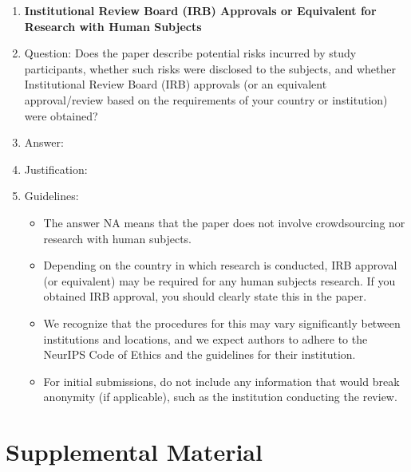 \documentclass{article} %
\newcounter{ct}
\theoremstyle{definition}
\theoremstyle{remark}
\begin{document}
\begin{enumerate}
\item {\bf Institutional Review Board (IRB) Approvals or Equivalent for Research with Human Subjects}
    \item[] Question: Does the paper describe potential risks incurred by study participants, whether such risks were disclosed to the subjects, and whether Institutional Review Board (IRB) approvals (or an equivalent approval/review based on the requirements of your country or institution) were obtained?
    \item[] Answer: \answerTODO{} %
    \item[] Justification: \justificationTODO{}
    \item[] Guidelines:
    \begin{itemize}
        \item The answer NA means that the paper does not involve crowdsourcing nor research with human subjects.
        \item Depending on the country in which research is conducted, IRB approval (or equivalent) may be required for any human subjects research. If you obtained IRB approval, you should clearly state this in the paper. 
        \item We recognize that the procedures for this may vary significantly between institutions and locations, and we expect authors to adhere to the NeurIPS Code of Ethics and the guidelines for their institution. 
        \item For initial submissions, do not include any information that would break anonymity (if applicable), such as the institution conducting the review.
    \end{itemize}

\end{enumerate}

\newpage
\appendix
\section*{Supplemental Material}
\setcounter{section}{0}
\renewcommand{\thefigure}{S\arabic{figure}} %
\renewcommand{\thesection}{S\arabic{section}} %
\end{document}

